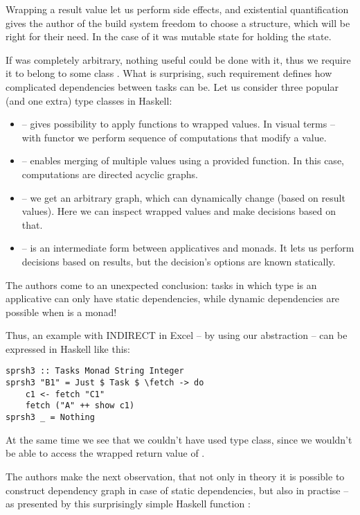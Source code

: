 Wrapping a result value let us perform side effects, and existential quantification gives the author of the build system freedom to choose a structure, which will be right for their need. In the case of  it was mutable state for holding the state.

If  was completely arbitrary, nothing useful could be done with it, thus we require it to belong to some class . What is surprising, such requirement defines how complicated dependencies between tasks can be. Let us consider three popular (and one extra) type classes in Haskell:
\begin{itemize}
\item {} -- gives possibility to apply functions to wrapped values. In visual terms -- with functor we perform sequence of computations that modify a value.
\item {} -- enables merging of multiple values using a provided function. In this case, computations are directed acyclic graphs.
\item {} -- we get an arbitrary graph, which can dynamically change (based on result values). Here we can inspect wrapped values and make decisions based on that.
\item {}\cite{mokhov2019selective} -- is an intermediate form between applicatives and monads. It lets us perform decisions based on results, but the decision's options are known statically.
\end{itemize}

The authors come to an unexpected conclusion: tasks in which type  is an applicative can only have static dependencies, while dynamic dependencies are possible when  is a monad!


Thus, an example with INDIRECT in Excel -- by using our abstraction -- can be expressed in Haskell like this:

\begin{lstlisting}
sprsh3 :: Tasks Monad String Integer
sprsh3 "B1" = Just $ Task $ \fetch -> do
    c1 <- fetch "C1"
    fetch ("A" ++ show c1)
sprsh3 _ = Nothing
\end{lstlisting}

At the same time we see that we couldn't have used  type class, since we wouldn't be able to access the wrapped return value of .

The authors make the next observation, that not only in theory it is possible to construct dependency graph in case of static dependencies, but also in practise -- as presented by this surprisingly simple Haskell function :

